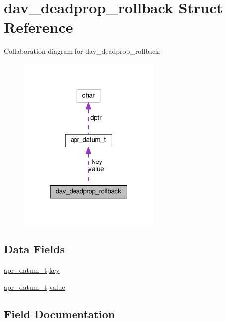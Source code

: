 \hypertarget{structdav__deadprop__rollback}{}\section{dav\+\_\+deadprop\+\_\+rollback Struct Reference}
\label{structdav__deadprop__rollback}


Collaboration diagram for dav\+\_\+deadprop\+\_\+rollback\+:
\nopagebreak
\begin{figure}[H]
\begin{center}
\leavevmode
\includegraphics[width=196pt]{structdav__deadprop__rollback__coll__graph}
\end{center}
\end{figure}
\subsection*{Data Fields}
\begin{DoxyCompactItemize}
\item 
\hyperlink{structapr__datum__t}{apr\+\_\+datum\+\_\+t} \hyperlink{structdav__deadprop__rollback_a04f9233f1afbe8f30acf8cee35b19aae}{key}
\item 
\hyperlink{structapr__datum__t}{apr\+\_\+datum\+\_\+t} \hyperlink{structdav__deadprop__rollback_a731262827a38ee646bb9197dfe53d8fd}{value}
\end{DoxyCompactItemize}


\subsection{Field Documentation}
